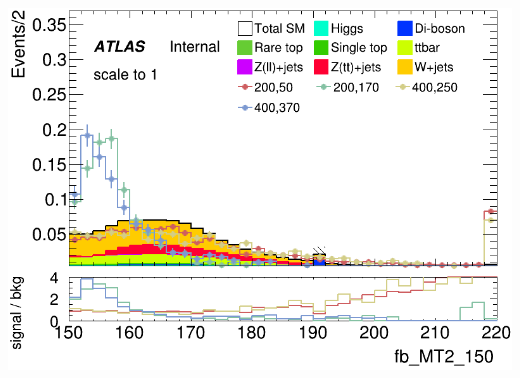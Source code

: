 \documentclass[usenames,dvipsnames]{beamer}
\begin{document}
\begin{frame}
\begin{minipage}{0.32\textwidth}
        \includegraphics[width=\textwidth]{graphics/LH_met_sig/LH_fb_MT2_150_norm.png}
    \end{minipage}
\end{frame}

%    
%
\end{document}
